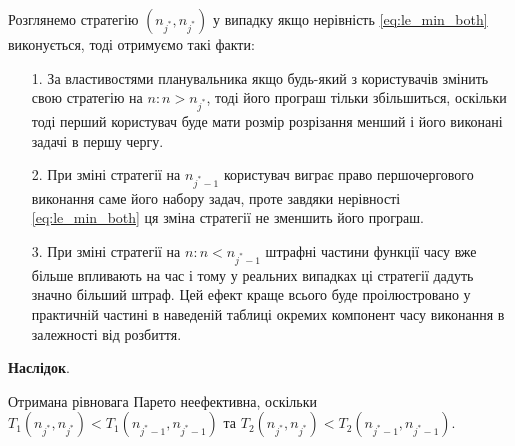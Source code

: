 Розглянемо стратегію $(n_{j^*},n_{j^*})$ у випадку якщо нерівність \ref{eq:le_min_both} виконується, тоді отримуємо такі факти:
\begin{itemize}
	\item[1.] За властивостями планувальника якщо будь-який з користувачів змінить свою стратегію на $n: n > n_{j^*}$, тоді його програш тільки збільшиться, оскільки тоді перший користувач буде мати розмір розрізання менший і його виконані задачі в першу чергу.
	
	\item[2.] При зміні стратегії на $n_{j^*-1}$ користувач виграє право першочергового виконання саме його набору задач, проте завдяки нерівності \ref{eq:le_min_both} ця зміна стратегії не зменшить його програш.
	
	\item[3.] При зміні стратегії на $n: n < n_{j^* - 1}$ штрафні частини функції часу вже більше впливають на час і тому у реальних випадках ці стратегії дадуть значно більший штраф. Цей ефект краще всього буде проілюстровано у практичній частині в наведеній таблиці окремих компонент часу виконання в залежності від розбиття.
\end{itemize}

\textbf{Наслідок}.

Отримана рівновага Парето неефективна, оскільки $T_1(n_{j^*},n_{j^*}) < T_1(n_{j^*-1},n_{j^*-1})$ та $T_2(n_{j^*},n_{j^*}) < T_2(n_{j^*-1},n_{j^*-1})$.




 